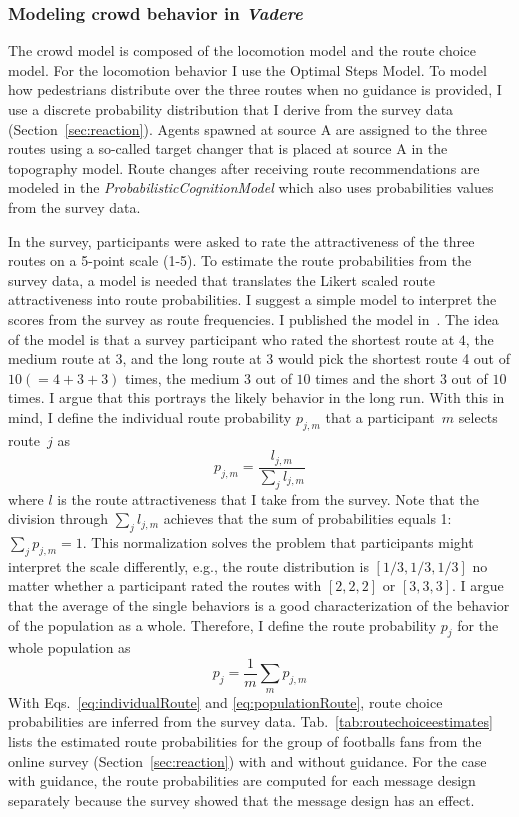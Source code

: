 \subsubsection{Modeling crowd behavior in \textit{Vadere}}
The crowd model is composed of the locomotion model and the route choice model. For the locomotion behavior I use the Optimal Steps Model. To model how pedestrians distribute over the three routes when no guidance is provided, I use a discrete probability distribution that I derive from the survey data (Section~\ref{sec:reaction}). Agents spawned at source A are assigned to the three routes using a so-called target changer that is placed at source A in the topography model.
Route changes after receiving route recommendations are modeled in the \textit{ProbabilisticCognitionModel} which also uses probabilities values from the survey data. 

In the survey, participants were asked to rate the attractiveness of the three routes on a 5-point scale (1-5).
To estimate the route probabilities from the survey data, a model is needed that translates the Likert scaled route attractiveness into route probabilities.
I suggest a simple model to interpret the scores from the survey as route frequencies. I published the model in~\cite{mayr-2023-cdyn}. The idea of the model is that a survey participant who rated the shortest route at $4$, the medium route at $3$, and the long route at $3$ would pick the shortest route 4 out of $10 (=4+3+3)$ times, the medium $3$ out of $10$ times and the short $3$ out of $10$ times. I argue that this portrays the likely behavior in the long run.
With this in mind, I define the individual route probability  $p_{j,m}$ that a participant~$m$ selects route~$j$ as
\begin{equation}
p_{j,m} = \frac{l_{j,m}}{\sum_j l_{j,m}}
\label{eq:individualRoute}
\end{equation}
where $l$ is the route attractiveness that I take from the survey. Note that the division through  $\sum_j l_{j,m}$ achieves that the sum of probabilities equals 1: $\sum_ j p_{j,m} = 1$. 
This normalization  solves the problem that participants might interpret the scale differently, e.g., the route distribution is $[1/3,1/3,1/3]$ no matter whether a participant rated the routes with $[2,2,2]$ or $[3,3,3]$.  
I argue that the average of the single behaviors is a good characterization of the behavior of the population as a whole. Therefore, I define the route probability $p_{j}$ for the whole population as
\begin{equation}
p_{j} = \frac{1}{m} \sum_m p_{j,m} 
\label{eq:populationRoute}
\end{equation}
With Eqs.~\eqref{eq:individualRoute} and \eqref{eq:populationRoute}, route choice probabilities are inferred from the survey data.  Tab.~\ref{tab:routechoiceestimates} lists the estimated route probabilities for the group of footballs fans from the online survey (Section~\ref{sec:reaction}) with and without guidance. For the case with guidance, the route probabilities are computed for each message design separately because the survey showed that the message design has an effect.



